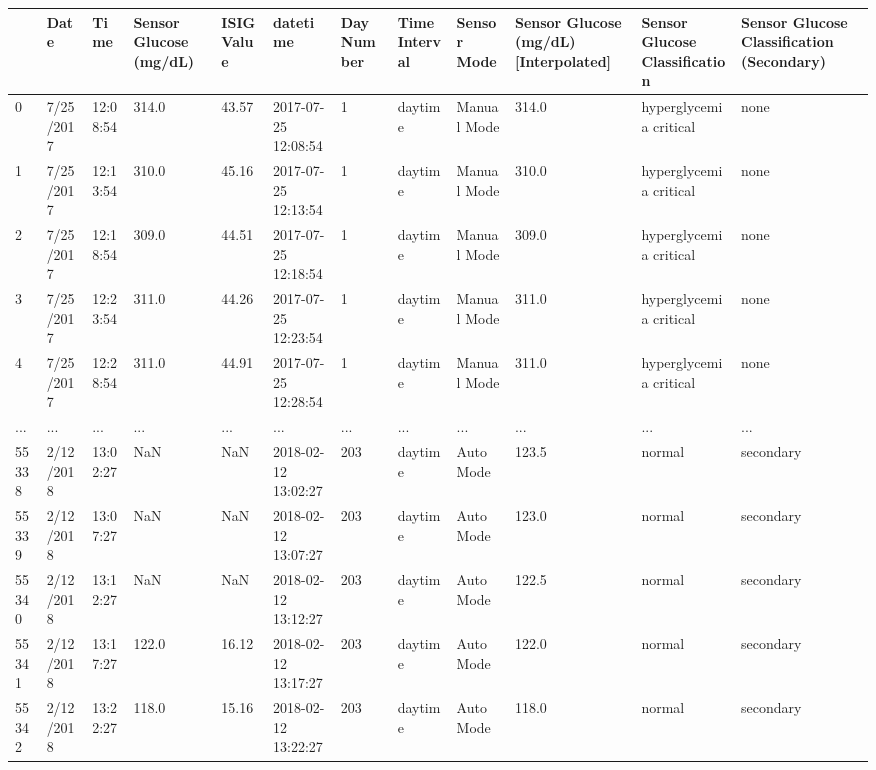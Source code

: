 \bigskip\noindent
\begin{tabular}{p{}p{}p{}p{}p{}p{}p{}p{}p{}p{}p{}p{}}
\toprule
 & Date & Time & Sensor Glucose (mg/dL) & ISIG Value & datetime & Day Number & Time Interval & Sensor Mode & Sensor Glucose (mg/dL) [Interpolated] & Sensor Glucose Classification & Sensor Glucose Classification (Secondary) \\
\hline
0 & 7/25/2017 & 12:08:54 & 314.0 & 43.57 & 2017-07-25 12:08:54 & 1 & daytime & Manual Mode & 314.0 & hyperglycemia critical & none \\
\hline
1 & 7/25/2017 & 12:13:54 & 310.0 & 45.16 & 2017-07-25 12:13:54 & 1 & daytime & Manual Mode & 310.0 & hyperglycemia critical & none \\
\hline
2 & 7/25/2017 & 12:18:54 & 309.0 & 44.51 & 2017-07-25 12:18:54 & 1 & daytime & Manual Mode & 309.0 & hyperglycemia critical & none \\
\hline
3 & 7/25/2017 & 12:23:54 & 311.0 & 44.26 & 2017-07-25 12:23:54 & 1 & daytime & Manual Mode & 311.0 & hyperglycemia critical & none \\
\hline
4 & 7/25/2017 & 12:28:54 & 311.0 & 44.91 & 2017-07-25 12:28:54 & 1 & daytime & Manual Mode & 311.0 & hyperglycemia critical & none \\
\hline
... & ... & ... & ... & ... & ... & ... & ... & ... & ... & ... & ... \\
\hline
55338 & 2/12/2018 & 13:02:27 & NaN & NaN & 2018-02-12 13:02:27 & 203 & daytime & Auto Mode & 123.5 & normal & secondary \\
\hline
55339 & 2/12/2018 & 13:07:27 & NaN & NaN & 2018-02-12 13:07:27 & 203 & daytime & Auto Mode & 123.0 & normal & secondary \\
\hline
55340 & 2/12/2018 & 13:12:27 & NaN & NaN & 2018-02-12 13:12:27 & 203 & daytime & Auto Mode & 122.5 & normal & secondary \\
\hline
55341 & 2/12/2018 & 13:17:27 & 122.0 & 16.12 & 2018-02-12 13:17:27 & 203 & daytime & Auto Mode & 122.0 & normal & secondary \\
\hline
55342 & 2/12/2018 & 13:22:27 & 118.0 & 15.16 & 2018-02-12 13:22:27 & 203 & daytime & Auto Mode & 118.0 & normal & secondary \\
\hline
\bottomrule
\end{tabular}

